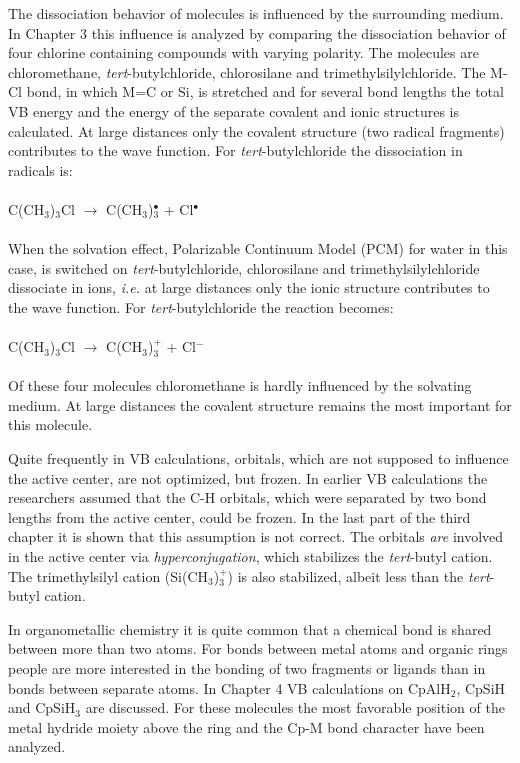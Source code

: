 The dissociation behavior of molecules is influenced by the surrounding medium. In Chapter 3 this influence is analyzed by comparing the dissociation behavior of four chlorine containing compounds with varying polarity. The molecules are chloromethane, \textit{tert}-butylchloride, chlorosilane and trimethylsilylchloride.  The M-Cl bond, in which M=C or Si,  is stretched and for several bond lengths the total VB energy and the energy of the separate covalent and ionic structures is calculated. At large distances only the covalent structure (two radical fragments) contributes to the wave function. For \textit{tert}-butylchloride the dissociation in radicals is:
\\
\\
C(CH$_3$)$_3$Cl  $\rightarrow$ C(CH$_3$)$_{3}^{\bullet}$ + Cl$^\bullet$
\\
\\
\noindent{}When the solvation effect, Polarizable Continuum Model (PCM) for water in this case, is switched on \textit{tert}-butylchloride, chlorosilane and trimethylsilylchloride dissociate in ions, \textit{i.e.} at large distances only the ionic structure contributes to the wave function. For \textit{tert}-butylchloride the reaction becomes:
\\
\\
C(CH$_3$)$_3$Cl  $\rightarrow$ C(CH$_3$)$_{3}^{+}$ + Cl$^{-}$
\\
\\
\noindent{}Of these four molecules chloromethane is hardly influenced by the solvating medium. At large distances the covalent structure remains the most important for this molecule.  

Quite frequently in VB calculations, orbitals, which are not supposed to influence the active center, are not optimized, but frozen. In earlier VB calculations the researchers assumed that the C-H orbitals, which were separated by two bond lengths from the active center, could be frozen. In the last part of the third chapter it is shown that this assumption is not correct. The orbitals \textit{are} involved in the active center via \textit{hyperconjugation}, which stabilizes the \textit{tert}-butyl cation. The trimethylsilyl cation (Si(CH$_3$)$_{3}^{+}$) is also stabilized, albeit less than the \textit{tert}-butyl cation. 

In organometallic chemistry it is quite common that a chemical bond is shared between more than two  atoms. For bonds between metal atoms and organic rings people are more interested in the bonding of two fragments or ligands than in bonds between separate atoms. In Chapter 4 VB calculations on CpAlH$_2$, CpSiH and CpSiH$_3$ are discussed. For these molecules the most favorable position of the metal hydride moiety above the ring and the Cp-M bond character have been analyzed.

